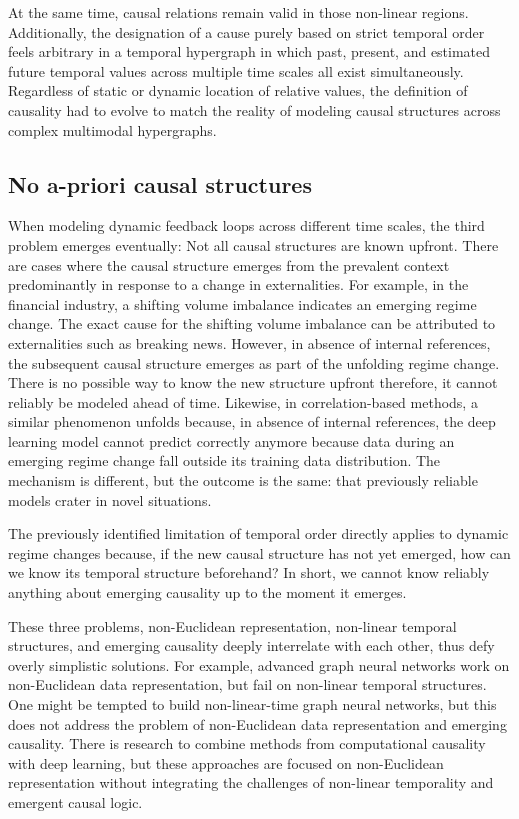 \documentclass{article}
\begin{document}
At the same time, causal relations remain valid in those non-linear regions. Additionally, the designation of a cause purely based on strict temporal order feels arbitrary in a temporal hypergraph in which past, present, and estimated future temporal values across multiple time scales all exist simultaneously. Regardless of static or dynamic location of relative values, the definition of causality had to evolve to match the reality of modeling causal structures across complex multimodal hypergraphs.


\subsection{No a-priori causal structures}

When modeling dynamic feedback loops across different time scales, the third problem emerges eventually: Not all causal structures are known upfront. There are cases where the causal structure emerges from the prevalent context predominantly in response to a change in externalities. For example, in the financial industry, a shifting volume imbalance indicates an emerging regime change. The exact cause for the shifting volume imbalance can be attributed to externalities such as breaking news. However, in absence of internal references, the subsequent  causal structure emerges as part of the unfolding regime change. There is no possible way to know the new structure upfront therefore, it cannot reliably be modeled ahead of time. Likewise, in correlation-based methods, a similar phenomenon unfolds because, in absence of internal references, the deep learning model cannot predict correctly anymore because data during an emerging regime change fall outside its training data distribution. The mechanism is different, but the outcome is the same: that previously reliable models crater in novel situations.

The previously identified limitation of temporal order directly applies to dynamic regime changes because, if the new causal structure has not yet emerged, how can we know its temporal structure beforehand? In short, we cannot know reliably anything about emerging causality up to the moment it emerges.

These three problems, non-Euclidean representation, non-linear temporal structures, and emerging causality deeply interrelate with each other, thus defy overly simplistic solutions. For example, advanced graph neural networks work on non-Euclidean data representation, but fail on non-linear temporal structures. One might be tempted to build non-linear-time graph neural networks, but this does not address the problem of non-Euclidean data representation and emerging causality. There is research to combine methods from computational causality with deep learning, but these approaches are focused on non-Euclidean representation without integrating the challenges of non-linear temporality and emergent causal logic.
\end{document}

